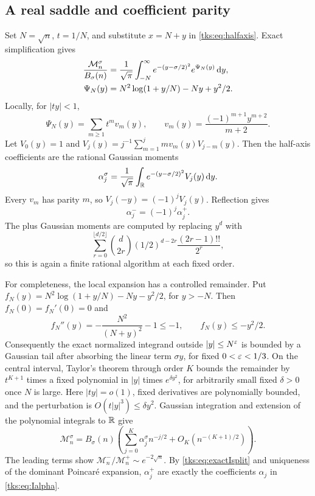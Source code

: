 \subsection{A real saddle and coefficient parity}
Set $N=\sqrt n$, $t=1/N$, and substitute $x=N+y$ in \eqref{tks:eq:halfaxis}. Exact simplification gives
\begin{align}
\frac{\mathcal M_n^\sigma}{B_\sigma(n)}
 &=\frac1{\sqrt\pi}\int_{-N}^{\infty}
     e^{-(y-\sigma/2)^2}e^{\Psi_N(y)}\,\mathrm d y,\label{tks:eq:realmoment}\\
\Psi_N(y)&=N^2\log(1+y/N)-Ny+y^2/2.\notag
\end{align}
Locally, for $|ty|<1$,
\[
\Psi_N(y)=\sum_{m\geq1}t^m v_m(y),\qquad
v_m(y)=\frac{(-1)^{m+1}y^{m+2}}{m+2}.
\]
Let $V_0(y)=1$ and $V_j(y)=j^{-1}\sum_{m=1}^jmv_m(y)V_{j-m}(y)$. Then the half-axis coefficients are the rational Gaussian moments
\begin{equation}\label{tks:eq:sectorcoeff}
\alpha_j^\sigma=\frac1{\sqrt\pi}
       \int_\mathbb R e^{-(y-\sigma/2)^2}V_j(y)\,\mathrm d y.
\end{equation}
Every $v_m$ has parity $m$, so $V_j(-y)=(-1)^jV_j(y)$. Reflection gives
\begin{equation}\label{tks:eq:sectorparity}
\alpha_j^-=(-1)^j\alpha_j^+.
\end{equation}
The plus Gaussian moments are computed by replacing $y^d$ with
\[
\sum_{r=0}^{\lfloor d/2\rfloor}
  \binom d{2r}(1/2)^{d-2r}\frac{(2r-1)!!}{2^r},
\]
so this is again a finite rational algorithm at each fixed order.

For completeness, the local expansion has a controlled remainder. Put
$f_N(y)=N^2\log(1+y/N)-Ny-y^2/2$, for $y>-N$. Then
$f_N(0)=f_N'(0)=0$ and
\[
f_N''(y)=-\frac{N^2}{(N+y)^2}-1\leq-1,
\qquad f_N(y)\leq-y^2/2.
\]
Consequently the exact normalized integrand outside $|y|\leq N^\varepsilon$ is bounded by a Gaussian tail after absorbing the linear term $\sigma y$, for fixed $0<\varepsilon<1/3$. On the central interval, Taylor's theorem through order $K$ bounds the remainder by $t^{K+1}$ times a fixed polynomial in $|y|$ times $e^{\delta y^2}$, for arbitrarily small fixed $\delta>0$ once $N$ is large. Here $|ty|=o(1)$, fixed derivatives are polynomially bounded, and the perturbation is $O(t|y|^3)\leq\delta y^2$. Gaussian integration and extension of the polynomial integrals to $\mathbb R$ give
\begin{equation}\label{tks:eq:momentexpansion}
\mathcal M_n^\sigma=B_\sigma(n)
 \left(\sum_{j=0}^{K}\alpha_j^\sigma n^{-j/2}
                 +O_K(n^{-(K+1)/2})\right).
\end{equation}
The leading terms show $\mathcal M_n^-/\mathcal M_n^+\sim e^{-2\sqrt n}$. By \eqref{tks:eq:exactIsplit} and uniqueness of the dominant Poincar\'e expansion, $\alpha_j^+$ are exactly the coefficients $\alpha_j$ in \eqref{tks:eq:Ialpha}.

